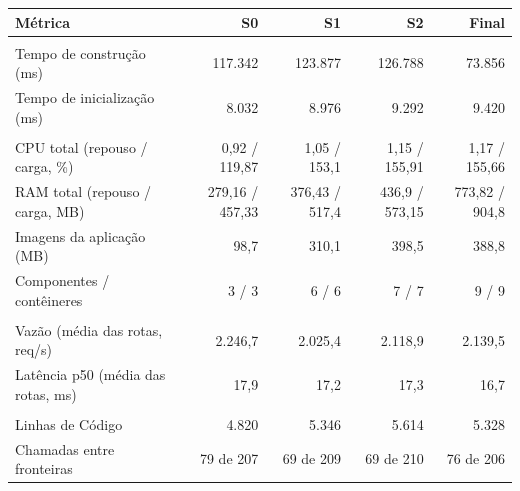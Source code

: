 \begin{quadro}[htb]
  \centering
  \caption{E-commerce --- métricas por snapshot --- Subdomínio (DDD).}
  \label{qua:comp_ecommerce_subdominio_snapshots}
  \renewcommand{\arraystretch}{1.15}
  \begin{tabularx}{\textwidth}{|>{\raggedright\arraybackslash}X|r|r|r|r|}
    \hline
    \textbf{Métrica} & \textbf{S0} & \textbf{S1} & \textbf{S2} & \textbf{Final} \\
    \hline
    \multicolumn{5}{|l|}{\textbf{Agilidade}} \\
    \hline
    Tempo de construção (ms) & 117.342 & 123.877 & 126.788 & 73.856 \\
    Tempo de inicialização (ms) & 8.032 & 8.976 & 9.292 & 9.420 \\
    \hline
    \multicolumn{5}{|l|}{\textbf{Custo}} \\
    \hline
    CPU total (repouso / carga, \%) & 0,92 / 119,87 & 1,05 / 153,1 & 1,15 / 155,91 & 1,17 / 155,66 \\
    RAM total (repouso / carga, MB) & 279,16 / 457,33 & 376,43 / 517,4 & 436,9 / 573,15 & 773,82 / 904,8 \\
    Imagens da aplicação (MB) & 98,7 & 310,1 & 398,5 & 388,8 \\
    Componentes / contêineres & 3 / 3 & 6 / 6 & 7 / 7 & 9 / 9 \\
    \hline
    \multicolumn{5}{|l|}{\textbf{Desempenho}} \\
    \hline
    Vazão (média das rotas, req/s) & 2.246,7 & 2.025,4 & 2.118,9 & 2.139,5 \\
    Latência p50 (média das rotas, ms) & 17,9 & 17,2 & 17,3 & 16,7 \\
    \hline
    \multicolumn{5}{|l|}{\textbf{Manutenibilidade}} \\
    \hline
    Linhas de Código & 4.820 & 5.346 & 5.614 & 5.328 \\
    Chamadas entre fronteiras & 79 de 207 & 69 de 209 & 69 de 210 & 76 de 206 \\
    \hline
  \end{tabularx}
\end{quadro}
